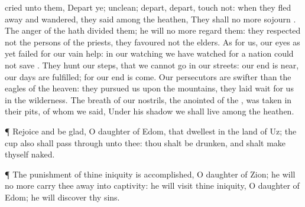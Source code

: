 {cried unto them,
Depart ye;
{}
unclean;
depart,
depart,
touch not: when they fled
away and
wandered, they
said among the
heathen, They shall no
more
sojourn
{}.
The
anger of the
{} hath
divided them; he will no
more
regard them: they
respected not the
persons of the
priests, they
favoured not the
elders.
As for us, our
eyes as yet
failed for our
vain
help: in our
watching we have
watched for a
nation
{} could not
save
{}.
They
hunt our
steps, that we cannot
go in our
streets: our
end is
near, our
days are
fulfilled; for our
end is
come.
Our
persecutors are
swifter than the
eagles of the
heaven: they
pursued us upon the
mountains, they laid
wait for us in the
wilderness.
The
breath of our
nostrils, the
anointed of the
{}, was
taken in their
pits, of whom we
said, Under his
shadow we shall
live among the
heathen.
\par }{\PP {}¶
Rejoice and be
glad, O
daughter of
Edom, that
dwellest in the
land of
Uz; the
cup also shall
pass through unto thee: thou shalt be
drunken, and shalt make thyself
naked.
\par }{\PP {}¶ The punishment of thine
iniquity is
accomplished, O
daughter of
Zion; he will no
more carry thee away into
captivity: he will
visit thine
iniquity, O
daughter of
Edom; he will
discover thy
sins.

}
